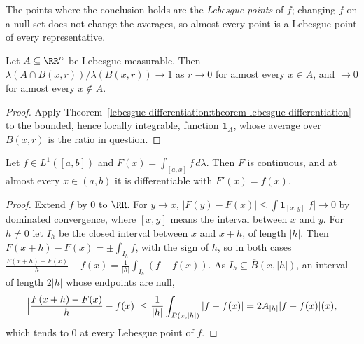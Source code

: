 The points where the conclusion holds are the \emph{Lebesgue points} of $f$; changing $f$ on a null set does not change the averages, so almost every point is
a Lebesgue point of every representative.

\begin{corollary}\label{lebesgue-differentiation:corollary-density}
Let $A \subseteq \RR^n$ be Lebesgue measurable. Then $\lambda(A \cap B(x, r))/\lambda(B(x, r)) \to 1$ as $r \to 0$ for almost every $x \in A$, and $\to 0$ for almost
every $x \notin A$.
\end{corollary}

\begin{proof}
Apply Theorem~\ref{lebesgue-differentiation:theorem-lebesgue-differentiation} to the bounded, hence locally integrable, function $\mathbf{1}_A$, whose average over $B(x, r)$ is
the ratio in question.
\end{proof}

\begin{corollary}\label{lebesgue-differentiation:corollary-ftc-lebesgue}
Let $f \in L^1([a, b])$ and $F(x) = \int_{[a, x]}f\,d\lambda$. Then $F$ is continuous, and at almost every $x \in (a, b)$ it is differentiable with $F'(x) = f(x)$.
\end{corollary}

\begin{proof}
Extend $f$ by $0$ to $\RR$. For $y \to x$, $|F(y) - F(x)| \leq \int\mathbf{1}_{[x, y]}|f| \to 0$ by dominated convergence, where $[x, y]$ means the interval between
$x$ and $y$. For $h \neq 0$ let $I_h$ be the closed interval between $x$ and $x + h$, of length $|h|$. Then $F(x + h) - F(x) = \pm\int_{I_h}f$, with the sign of
$h$, so in both cases $\frac{F(x + h) - F(x)}{h} - f(x) = \frac{1}{|h|}\int_{I_h}(f - f(x))$. As $I_h \subseteq \overline{B}(x, |h|)$, an interval of length $2|h|$
whose endpoints are null,
\[
\Bigl|\frac{F(x + h) - F(x)}{h} - f(x)\Bigr| \leq \frac{1}{|h|}\int_{B(x, |h|)}|f - f(x)| = 2A_{|h|}|f - f(x)|(x),
\]
which tends to $0$ at every Lebesgue point of $f$.
\end{proof}

